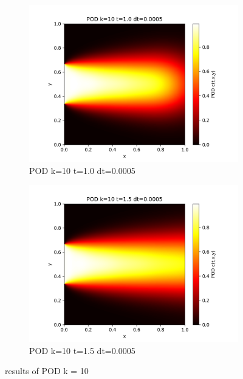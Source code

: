 \documentclass[11pt,a4 paper,one side]{article}
\begin{document}
\begin{figure}[htbp]
    \vspace{0.5cm}  %
    
    \begin{subfigure}{0.45\textwidth}
        \includegraphics[width=\textwidth]{POD k=10 t=1.0 dt=0.0005.png}
        \caption{POD k=10 t=1.0 dt=0.0005}
        \label{POD k=10 t=1.0 dt=0.0005}
    \end{subfigure}
    \hfill
    \begin{subfigure}{0.45\textwidth}
        \includegraphics[width=\textwidth]{POD k=10 t=1.5 dt=0.0005.png}
        \caption{POD k=10 t=1.5 dt=0.0005}
        \label{POD k=10 t=1.5 dt=0.0005}
    \end{subfigure}
    
    \caption{results of POD k = 10}
    \label{results of POD k = 10}
\end{figure}
\end{document}
